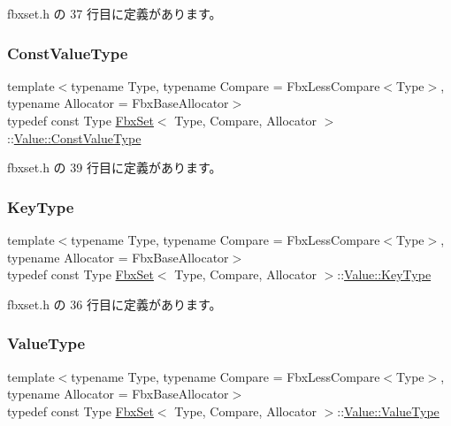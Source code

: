  fbxset.\+h の 37 行目に定義があります。

\mbox{\label{class_fbx_set_1_1_value_a4b01735d9b84587bb21bd4a9d75e419b}} 
\subsubsection{\texorpdfstring{Const\+Value\+Type}{ConstValueType}}
{\footnotesize\ttfamily template$<$typename Type, typename Compare = Fbx\+Less\+Compare$<$\+Type$>$, typename Allocator = Fbx\+Base\+Allocator$>$ \\
typedef const Type \hyperlink{class_fbx_set}{Fbx\+Set}$<$ Type, Compare, Allocator $>$\+::\hyperlink{class_fbx_set_1_1_value_a4b01735d9b84587bb21bd4a9d75e419b}{Value\+::\+Const\+Value\+Type}}



 fbxset.\+h の 39 行目に定義があります。

\mbox{\label{class_fbx_set_1_1_value_ad4958bd8730776f19c1309f457158acf}} 
\subsubsection{\texorpdfstring{Key\+Type}{KeyType}}
{\footnotesize\ttfamily template$<$typename Type, typename Compare = Fbx\+Less\+Compare$<$\+Type$>$, typename Allocator = Fbx\+Base\+Allocator$>$ \\
typedef const Type \hyperlink{class_fbx_set}{Fbx\+Set}$<$ Type, Compare, Allocator $>$\+::\hyperlink{class_fbx_set_1_1_value_ad4958bd8730776f19c1309f457158acf}{Value\+::\+Key\+Type}}



 fbxset.\+h の 36 行目に定義があります。

\mbox{\label{class_fbx_set_1_1_value_aa4757d6676c438c18ab271c57997d8eb}} 
\subsubsection{\texorpdfstring{Value\+Type}{ValueType}}
{\footnotesize\ttfamily template$<$typename Type, typename Compare = Fbx\+Less\+Compare$<$\+Type$>$, typename Allocator = Fbx\+Base\+Allocator$>$ \\
typedef const Type \hyperlink{class_fbx_set}{Fbx\+Set}$<$ Type, Compare, Allocator $>$\+::\hyperlink{class_fbx_set_1_1_value_aa4757d6676c438c18ab271c57997d8eb}{Value\+::\+Value\+Type}}



